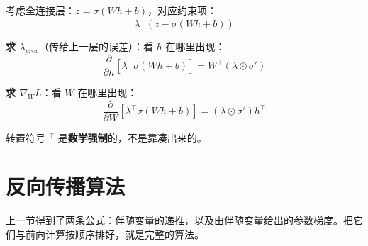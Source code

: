 \begin{examplebox}[title=拉格朗日方法的局部性]
考虑全连接层：$z = \sigma(Wh + b)$，对应约束项：
\begin{equation}
\lambda^\top (z - \sigma(Wh + b))
\end{equation}

\textbf{求 $\lambda_{prev}$}（传给上一层的误差）：看 $h$ 在哪里出现：
\begin{equation}
\frac{\partial}{\partial h}[\lambda^\top \sigma(Wh + b)] = W^\top (\lambda \odot \sigma')
\end{equation}

\textbf{求 $\nabla_W L$}：看 $W$ 在哪里出现：
\begin{equation}
\frac{\partial}{\partial W}[\lambda^\top \sigma(Wh + b)] = (\lambda \odot \sigma') h^\top
\end{equation}

转置符号 $^\top$ 是\textbf{数学强制}的，不是靠凑出来的。
\end{examplebox}

\section{反向传播算法}


上一节得到了两条公式：伴随变量的递推，以及由伴随变量给出的参数梯度。把它们与前向计算按顺序排好，就是完整的算法。

